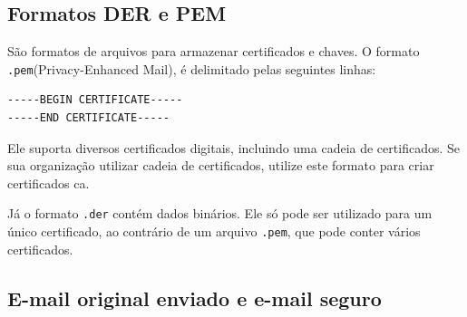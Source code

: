 \documentclass[
    article,            %
    11pt,               %
    oneside,            %
    a4paper,            %
    english,            %
    brazil,             %
    sumario=tradicional,
    ]{abntex2}
\begin{document}
\subsection{\textbf{Formatos DER e PEM}}
 
São formatos de arquivos para armazenar certificados e chaves. O formato \texttt{.pem}(Privacy-Enhanced Mail), é delimitado pelas seguintes linhas:
\begin{Verbatim}[commandchars=\\\{\}, fontsize=\footnotesize]
-----BEGIN CERTIFICATE-----
-----END CERTIFICATE-----
\end{Verbatim}

\indent Ele suporta diversos certificados digitais, incluindo uma cadeia de certificados. Se sua organização utilizar cadeia de certificados, utilize este formato para criar certificados ca. \cite{ibm-pem-der}

Já o formato \texttt{.der} contém dados binários. Ele só pode ser utilizado para um único certificado, ao contrário de um arquivo \texttt{.pem}, que pode conter vários certificados. \cite{ibm-pem-der}

\subsection{\textbf{E-mail original enviado e e-mail seguro}}
\end{document}
